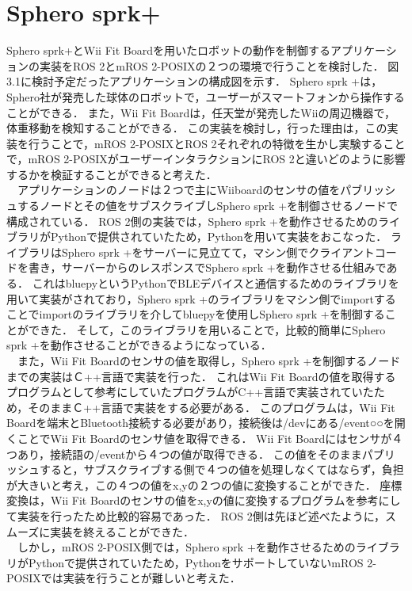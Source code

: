 \section{Sphero sprk+}
Sphero sprk+とWii Fit Boardを用いたロボットの動作を制御するアプリケーションの実装をROS 2とmROS 2-POSIXの２つの環境で行うことを検討した．
図3.1に検討予定だったアプリケーションの構成図を示す．
Sphero sprk +は，Sphero社が発売した球体のロボットで，ユーザーがスマートフォンから操作することができる．
また，Wii Fit Boardは，任天堂が発売したWiiの周辺機器で，体重移動を検知することができる．
この実装を検討し，行った理由は，この実装を行うことで，mROS 2-POSIXとROS 2それぞれの特徴を生かし実験することで，mROS 2-POSIXがユーザーインタラクションにROS 2と違いどのように影響するかを検証することができると考えた．
\\　アプリケーションのノードは２つで主にWiiboardのセンサの値をパブリッシュするノードとその値をサブスクライブしSphero sprk +を制御させるノードで構成されている．
ROS 2側の実装では，Sphero sprk +を動作させるためのライブラリがPythonで提供されていたため，Pythonを用いて実装をおこなった．
ライブラリはSphero sprk +をサーバーに見立てて，マシン側でクライアントコードを書き，サーバーからのレスポンスでSphero sprk +を動作させる仕組みである．
これはbluepyというPythonでBLEデバイスと通信するためのライブラリを用いて実装がされており，Sphero sprk +のライブラリをマシン側でimportすることでimportのライブラリを介してbluepyを使用しSphero sprk +を制御することができた．
そして，このライブラリを用いることで，比較的簡単にSphero sprk +を動作させることができるようになっている．
\\　また，Wii Fit Boardのセンサの値を取得し，Sphero sprk +を制御するノードまでの実装はＣ++言語で実装を行った．
これはWii Fit Boardの値を取得するプログラムとして参考にしていたプログラムがC++言語で実装されていたため，そのままＣ++言語で実装をする必要がある．
このプログラムは，Wii Fit Boardを端末とBluetooth接続する必要があり，接続後は/devにある/event○○を開くことでWii Fit Boardのセンサ値を取得できる．
Wii Fit Boardにはセンサが４つあり，接続語の/eventから４つの値が取得できる．
この値をそのままパブリッシュすると，サブスクライブする側で４つの値を処理しなくてはならず，負担が大きいと考え，この４つの値をx,yの２つの値に変換することができた．
座標変換は，Wii Fit Boardのセンサの値をx,yの値に変換するプログラムを参考にして実装を行ったため比較的容易であった．
ROS 2側は先ほど述べたように，スムーズに実装を終えることができた．
\\　しかし，mROS 2-POSIX側では，Sphero sprk +を動作させるためのライブラリがPythonで提供されていたため，PythonをサポートしていないmROS 2-POSIXでは実装を行うことが難しいと考えた．
